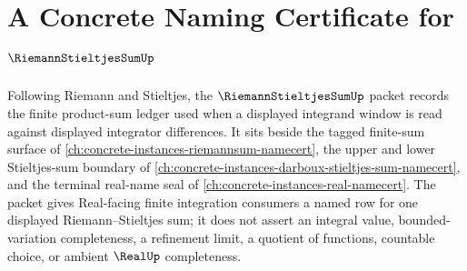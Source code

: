 \chapter{A Concrete Naming Certificate for $\RiemannStieltjesSumUp$}
\label{ch:concrete-instances-riemann-stieltjes-sum-namecert}

Following Riemann and Stieltjes, the $\RiemannStieltjesSumUp$ packet records the finite product-sum ledger used when a displayed integrand window is read against displayed integrator differences. It sits beside the tagged finite-sum surface of \autoref{ch:concrete-instances-riemannsum-namecert}, the upper and lower Stieltjes-sum boundary of \autoref{ch:concrete-instances-darboux-stieltjes-sum-namecert}, and the terminal real-name seal of \autoref{ch:concrete-instances-real-namecert}. The packet gives Real-facing finite integration consumers a named row for one displayed Riemann--Stieltjes sum; it does not assert an integral value, bounded-variation completeness, a refinement limit, a quotient of functions, countable choice, or ambient $\RealUp$ completeness.

